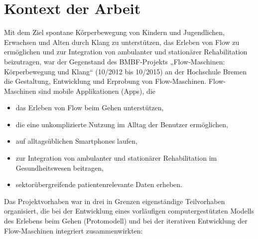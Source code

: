 
\section{Kontext der Arbeit} %
\label{sec:kontext_der_arbeit}

Mit dem Ziel spontane Körperbewegung von Kindern und Jugendlichen, Erwachsen und Alten durch Klang zu unterstützen, das Erleben von Flow zu ermöglichen und zur Integration von ambulanter und stationärer Rehabilitation beizutragen, war der Gegenstand des \acs{BMBF}-Projekts „Flow-Maschinen: Körperbewegung und Klang“ (10/2012 bis 10/2015) an der Hochschule Bremen die Gestaltung, Entwicklung und Erprobung von Flow-Maschinen. Flow-Maschinen sind mobile Applikationen (Apps), die
\begin{itemize}

	\item das Erleben von Flow beim Gehen unterstützen,

	\item die eine unkomplizierte Nutzung im Alltag der Benutzer ermöglichen,

	\item auf alltagsüblichen Smartphones laufen,

	\item zur Integration von ambulanter und stationärer Rehabilitation im Gesundheitswesen beitragen,

	\item sektorübergreifende patientenrelevante Daten erheben.

\end{itemize}

Das Projektvorhaben war in drei in Grenzen eigenständige Teilvorhaben organisiert, die bei der Entwicklung eines vorläufigen computergestützten Modells des Erlebens beim Gehen (Protomodell) und bei der iterativen Entwicklung der Flow-Maschinen integriert zusammenwirkten:

